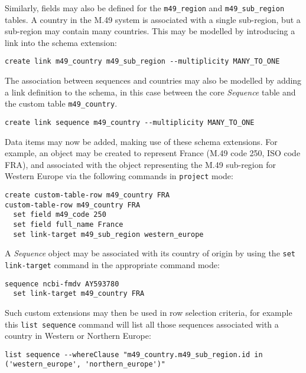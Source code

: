 Similarly, fields may also be defined for the \texttt{m49\_region} and
\texttt{m49\_sub\_region} tables. A country in the M.49 system is associated
with a single sub-region, but a sub-region may contain many countries. This may
be modelled by introducing a link into the schema extension:

\begin{verbatim}
create link m49_country m49_sub_region --multiplicity MANY_TO_ONE
\end{verbatim}

The association between sequences and countries may also be modelled by adding a
link definition to the schema, in this case between the core \emph{Sequence}
table and the custom table \texttt{m49\_country}.

\begin{verbatim}
create link sequence m49_country --multiplicity MANY_TO_ONE
\end{verbatim}

Data items may now be added, making use of these schema extensions. For example,
an object may be created to represent France (M.49 code 250, ISO code FRA), and
associated with the object representing the M.49 sub-region for Western Europe
via the following commands in \texttt{project} mode:

\begin{verbatim}
create custom-table-row m49_country FRA
custom-table-row m49_country FRA
  set field m49_code 250
  set field full_name France
  set link-target m49_sub_region western_europe
\end{verbatim}

A \emph{Sequence} object may be associated with its country of origin by
using the \texttt{set link-target} command in the appropriate command mode:

\begin{verbatim}
sequence ncbi-fmdv AY593780
  set link-target m49_country FRA
\end{verbatim}

Such custom extensions may then be used in row selection criteria, for example
this \texttt{list sequence} command will list all those sequences associated
with a country in Western or Northern Europe:

\begin{verbatim}
list sequence --whereClause "m49_country.m49_sub_region.id in
('western_europe', 'northern_europe')"
\end{verbatim}

